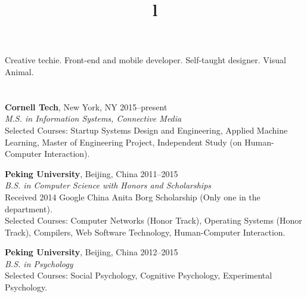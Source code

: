 \begin{resume}

\vspace{25pt}

\section{}

Creative techie. Front-end and mobile developer. Self-taught designer. Visual Animal. 


\section{}

\textbf{Cornell Tech}, New York, NY \hfill 2015--present \\
\textsl{M.S. in Information Systems, Connective Media} \\
Selected Courses: Startup Systems Design and Engineering, Applied Machine Learning, Master of Engineering Project, Independent Study (on Human-Computer Interaction).

\textbf{Peking University}, Beijing, China \hfill 2011--2015 \\ 
\textsl{B.S. in Computer Science with Honors and Scholarships}\\
Received 2014 Google China Anita Borg Scholarship (Only one in the department). \\
Selected Courses: Computer Networks (Honor Track), Operating Systems (Honor Track), Compilers, Web Software Technology, Human-Computer Interaction.

\textbf{Peking University}, Beijing, China \hfill 2012--2015 \\ 
\textsl{B.S. in Psychology}\\
Selected Courses: Social Psychology, Cognitive Psychology, Experimental Psychology.

\begin{formatb}
  \\
  \title{l}\\
  \body\\
\end{formatb}


\section{}


\end{resume}
